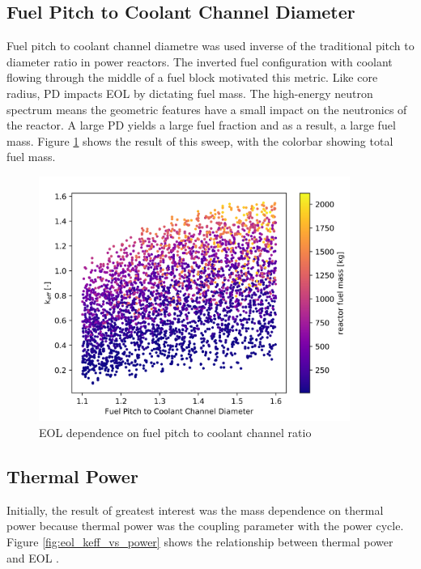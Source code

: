 \subsection{Fuel Pitch to Coolant Channel Diameter}
Fuel pitch to coolant channel diametre was used inverse of the traditional pitch
to diameter ratio in power reactors. The inverted fuel configuration with
coolant flowing through the middle of a fuel block motivated this metric. Like
core radius, PD impacts EOL \keff by dictating fuel mass. The high-energy
neutron spectrum means the geometric features have a small impact on the
neutronics of the reactor. A large PD yields a large fuel fraction and as a
result, a large fuel mass. Figure
\ref{fig:eol_keff_vs_PD_mass} shows the result of this sweep, with the colorbar
showing total fuel mass.

\begin{figure}[h]
    \centering
    \includegraphics[width=4in]{../images/keff_vs_PD_mass.png}
\caption{EOL \keff dependence on fuel pitch to coolant channel ratio}
\label{fig:eol_keff_vs_PD_mass}
\end{figure}


\subsection{Thermal Power}
Initially, the result of greatest interest was the mass dependence on thermal
power because thermal power was the coupling parameter with the power cycle.
Figure \ref{fig:eol_keff_vs_power} shows the relationship between thermal power
and EOL \keff.

